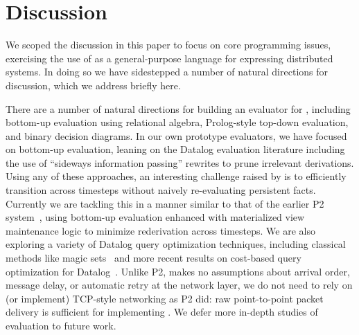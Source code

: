 \section{Discussion}
We scoped the discussion in this paper to focus on core programming issues, exercising the use of \lang as a general-purpose language for expressing distributed systems.  In doing so we have sidestepped a number of natural directions for discussion, which we address briefly here.
    
There are a number of natural directions for building an evaluator for \lang, including bottom-up evaluation using relational algebra, Prolog-style top-down evaluation, and binary decision diagrams.  In our own prototype evaluators, we have focused on bottom-up evaluation, leaning on the Datalog evaluation literature including the use of ``sideways information passing'' rewrites to prune irrelevant derivations.  Using any of these approaches, an interesting challenge raised by \lang is to efficiently transition across timesteps without naively re-evaluating persistent facts.  Currently we are tackling this in a manner similar to that of the earlier P2 system~\cite{p2}, using bottom-up evaluation enhanced with materialized view maintenance logic to minimize rederivation across timesteps. We are also exploring a variety of Datalog query optimization techniques, including classical methods like magic sets~\cite{ullmanbook} and more recent results on cost-based query optimization for Datalog~\cite{demoor}.  Unlike P2, \lang makes no assumptions about arrival order, message delay, or automatic retry at the network layer, we do not need to rely on (or implement) TCP-style networking as P2 did: raw point-to-point packet delivery is sufficient for implementing \lang.  We defer more in-depth studies of \lang evaluation to future work.


